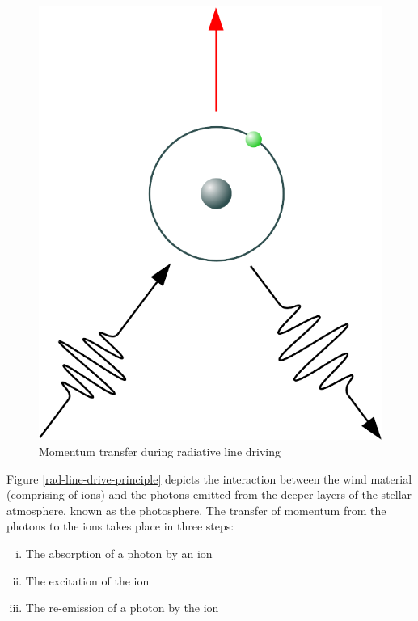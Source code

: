 		\begin{figure}[h!]
			\centering
			\caption{Momentum transfer during radiative line driving}
			\label{rad-line-drive-momentum}
			\includegraphics[scale=1.0]{rad-line-drive-04}
		\end{figure}
		Figure \ref{rad-line-drive-principle} depicts the interaction between the wind material (comprising of ions) and the photons emitted from the deeper layers of the stellar atmosphere, known as the photosphere. The transfer of momentum from the photons to the ions takes place in three steps:
		\begin{enumerate}[i.]
			\item The absorption of a photon by an ion
			\item The excitation of the ion
			\item The re-emission of a photon by the ion
		\end{enumerate}
